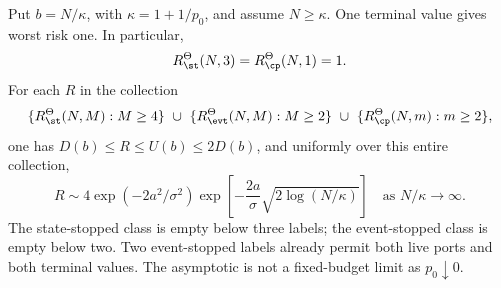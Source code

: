 \begin{theorem}\label{thm:gaussian}
Put $b=N/\kappa$, with $\kappa=1+1/p_0$, and assume $N\ge\kappa$. One terminal value gives worst risk one. In particular,
\begin{equation}\label{eq:gaussian-width}
 R_\st^\Theta(N,3)=R_\cp^\Theta(N,1)=1.
\end{equation}
For each $R$ in the collection
\[
 \{R_\st^\Theta(N,M):M\ge4\}\ \cup\
 \{R_\evt^\Theta(N,M):M\ge2\}\ \cup\
 \{R_\cp^\Theta(N,m):m\ge2\},
\]
one has $D(b)\le R\le U(b)\le2D(b)$, and uniformly over this entire collection,
\begin{equation}\label{eq:gaussian-asymp}
 R\sim 4\exp(-2a^2/\sigma^2)
       \exp\!\left[-\frac{2a}{\sigma}\sqrt{2\log(N/\kappa)}\right]
 \quad\text{as }N/\kappa\longrightarrow\infty.
\end{equation}
The state-stopped class is empty below three labels; the event-stopped class is empty below two. Two event-stopped labels already permit both live ports and both terminal values. The asymptotic is not a fixed-budget limit as $p_0\downarrow0$.
\end{theorem}
